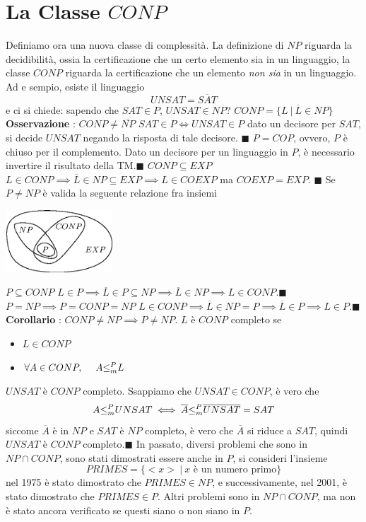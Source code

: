 \documentclass[10pt, letterpaper]{report}
\begin{document}
\section{La Classe $CONP$}
Definiamo ora una nuova classe di complessità. La definizione di $NP$ riguarda la decidibilità, ossia la certificazione che un certo elemento sia in un linguaggio, la classe $CONP$ riguarda la certificazione che un elemento \textit{non sia} in un linguaggio.\acc 
Ad e sempio, esiste il linguaggio $$ UNSAT=\overline{SAT}$$
e ci si chiede: sapendo che $SAT\in P$, $UNSAT\in NP$?\acc 
{} $CONP=\{L \ | \ \overline{L}\in NP\}$\acc 
\textbf{Osservazione} : $CONP \ne \overline{NP}$\acc 
\teo{} $SAT\in P \iff UNSAT \in P$\acc 
\dimo{} dato un decisore per $SAT$, si decide $UNSAT$ negando la risposta di tale decisore.
\hfill$\blacksquare$\acc  
\teo{} $P=COP$, ovvero, $P$ è chiuso per il complemento.\acc 
\dimo{} Dato un decisore per un linguaggio in $P$, è necessario invertire il risultato della TM.\hfill$\blacksquare$\acc   
\teo{} $CONP\subseteq EXP$\acc 
\dimo{} $L\in CONP \implies \overline L \in NP \subseteq EXP \implies L\in COEXP$ ma $COEXP=EXP$.
\hfill$\blacksquare$\acc  
Se $P\ne NP$ è valida la seguente relazione fra insiemi 
\begin{center}
    \includegraphics[width=0.3\textwidth ]{images/CONP.eps}
\end{center}
\teo{} $P\subseteq CONP$\acc 
\dimo{} $L\in P\implies \overline L \in P \subseteq NP \implies 
\overline L \in NP \implies L\in CONP$.\hfill$\blacksquare$\acc  
\teo{} $P=NP\implies P=CONP=NP$\acc 
\dimo{} $L\in CONP\implies \overline L \in NP=P \implies \overline L \in P \implies L \in P$.\hfill$\blacksquare$\acc   
\textbf{Corollario} : $CONP\ne NP\implies P \ne NP$.\acc
{} $L$ è $CONP$ completo se\begin{itemize}
    \item $L\in CONP$
    \item $\forall A \in CONP, \ \ \ \ A{\le_m^P} L$
\end{itemize} 
\teo{} $UNSAT$ è $CONP$ completo.\acc 
\dimo{} Ssappiamo che $UNSAT\in CONP$, è vero che 
$$ A{\le_m^P} UNSAT \iff \overline A {\le_m^P} \overline{UNSAT}=SAT$$
siccome $\overline A$ è in $NP$ e $SAT$ è $NP$ completo, è vero che $\overline A$ si riduce a $SAT$, quindi $UNSAT$ è $CONP$ completo.\hfill$\blacksquare$\acc  
In passato, diversi problemi che sono in $NP\cap CONP$, sono stati dimostrati essere anche in $P$, si consideri l'insieme 
$$ PRIMES=\{<x> \ | \ x\text{ è un numero primo}\}$$
nel 1975 è stato dimostrato che $PRIMES\in NP$, e successivamente, nel 2001, è stato dimostrato che $PRIMES\in P$. Altri problemi sono in $NP\cap CONP$, ma non è stato ancora verificato se questi siano o non siano in $P$.
\end{document}
